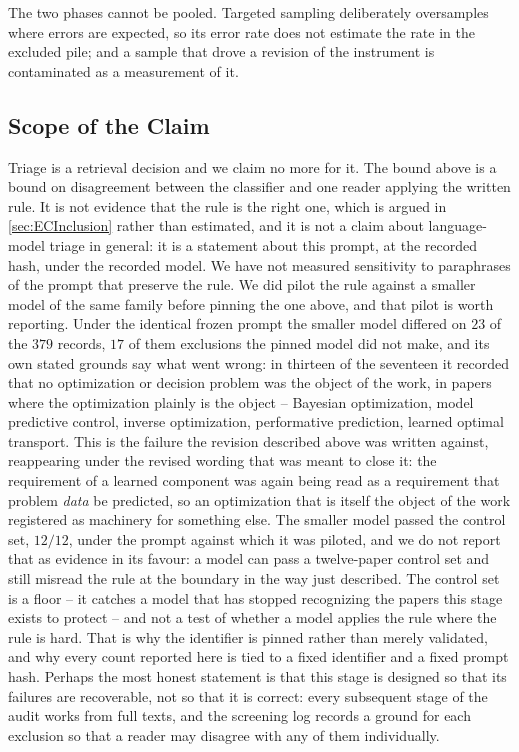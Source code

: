 The two phases cannot be pooled. Targeted sampling deliberately oversamples where errors are
expected, so its error rate does not estimate the rate in the excluded pile; and a sample that drove
a revision of the instrument is contaminated as a measurement of it.

\subsection{Scope of the Claim}

Triage is a retrieval decision and we claim no more for it. The bound above is a bound on
disagreement between the classifier and one reader applying the written rule. It is not evidence that
the rule is the right one, which is argued in \cref{sec:ECInclusion} rather than estimated, and it is
not a claim about language-model triage in general: it is a statement about this prompt, at the
recorded hash, under the recorded model. We have not measured sensitivity to paraphrases of the
prompt that preserve the rule. We did pilot the rule against a smaller model of the same family
before pinning the one above, and that pilot is worth reporting. Under the identical frozen prompt
the smaller model differed on \(23\) of the \(379\) records, \(17\) of them exclusions the pinned
model did not make, and its own stated grounds say what went wrong: in thirteen of the seventeen it
recorded that no optimization or decision problem was the object of the work, in papers where the
optimization plainly is the object -- Bayesian optimization, model predictive control, inverse
optimization, performative prediction, learned optimal transport. This is the failure the revision
described above was written against, reappearing under the revised wording that was meant to close
it: the requirement of a learned component was again being read as a requirement that problem
\emph{data} be predicted, so an optimization that is itself the object of the work registered as
machinery for something else. The smaller model passed the control set, \(12/12\), under the prompt
against which it was piloted, and we do not report that as evidence in its favour: a model can pass
a twelve-paper control set and still misread the rule at the boundary in the way just described.
The control set is a floor -- it catches a model that has stopped recognizing the papers this stage
exists to protect -- and not a test of whether a model applies the rule where the rule is hard. That
is why the identifier is pinned rather than merely validated, and why every count reported here is
tied to a fixed identifier and a fixed prompt hash. Perhaps the most honest statement is that
this stage is designed so that its failures are recoverable, not so that it is correct: every
subsequent stage of the audit works from full texts, and the screening log records a ground for
each exclusion so that a reader may disagree with any of them individually.

